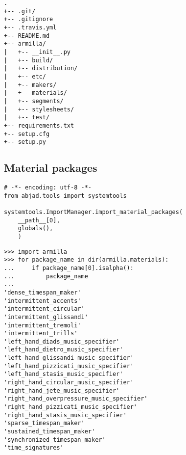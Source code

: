 \begin{singlespacing}
\vspace{-0.5\baselineskip}
\begin{lstlisting}
.
+-- .git/
+-- .gitignore
+-- .travis.yml
+-- README.md
+-- armilla/
|   +-- __init__.py
|   +-- build/
|   +-- distribution/
|   +-- etc/
|   +-- makers/
|   +-- materials/
|   +-- segments/
|   +-- stylesheets/
|   +-- test/
+-- requirements.txt
+-- setup.cfg
+-- setup.py
\end{lstlisting}
\end{singlespacing}

\subsection{Material packages}

\begin{singlespacing}
\vspace{-0.5\baselineskip}
\begin{lstlisting}
# -*- encoding: utf-8 -*-
from abjad.tools import systemtools

systemtools.ImportManager.import_material_packages(
    __path__[0],
    globals(),
    )
\end{lstlisting}
\end{singlespacing}

\begin{comment}
<abjad>
import armilla
for package_name in dir(armilla.materials):
    if package_name[0].isalpha():
        package_name

</abjad>
\end{comment}

\begin{abjadbookoutput}
\begin{singlespacing}
\vspace{-0.5\baselineskip}
\begin{lstlisting}
>>> import armilla
>>> for package_name in dir(armilla.materials):
...     if package_name[0].isalpha():
...         package_name
...
'dense_timespan_maker'
'intermittent_accents'
'intermittent_circular'
'intermittent_glissandi'
'intermittent_tremoli'
'intermittent_trills'
'left_hand_diads_music_specifier'
'left_hand_dietro_music_specifier'
'left_hand_glissandi_music_specifier'
'left_hand_pizzicati_music_specifier'
'left_hand_stasis_music_specifier'
'right_hand_circular_music_specifier'
'right_hand_jete_music_specifier'
'right_hand_overpressure_music_specifier'
'right_hand_pizzicati_music_specifier'
'right_hand_stasis_music_specifier'
'sparse_timespan_maker'
'sustained_timespan_maker'
'synchronized_timespan_maker'
'time_signatures'
\end{lstlisting}
\end{singlespacing}
\end{abjadbookoutput}


